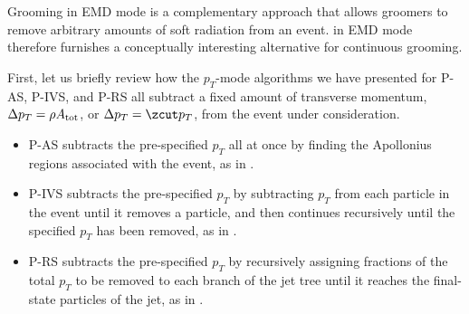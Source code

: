 \documentclass[letterpaper,11pt]{article}
\begin{document}
Grooming in EMD mode is a complementary approach that allows \PIRANHA{} groomers to remove arbitrary amounts of soft radiation from an event.
%
\PIRANHA{} in EMD mode therefore furnishes a conceptually interesting alternative for continuous grooming.

First, let us briefly review how the \(p_T\)-mode algorithms we have presented for P-AS, P-IVS, and P-RS all subtract a fixed amount of transverse momentum, \(\Delta p_T = \rho A_{\rm tot}\), or \(\Delta p_T = \zcut p_T\), from the event under consideration.
%
\begin{itemize}
\item
P-AS subtracts the pre-specified \(p_T\) all at once by finding the Apollonius regions associated with the event, as in .
%
\item
P-IVS subtracts the pre-specified \(p_T\) by subtracting \(p_T\) from each particle in the event until it removes a particle, and then continues recursively until the specified \(p_T\) has been removed, as in .
%
\item
P-RS subtracts the pre-specified \(p_T\) by recursively assigning fractions of the total \(p_T\) to be removed to each branch of the jet tree until it reaches the final-state particles of the jet, as in .
\end{itemize}
\end{document}
